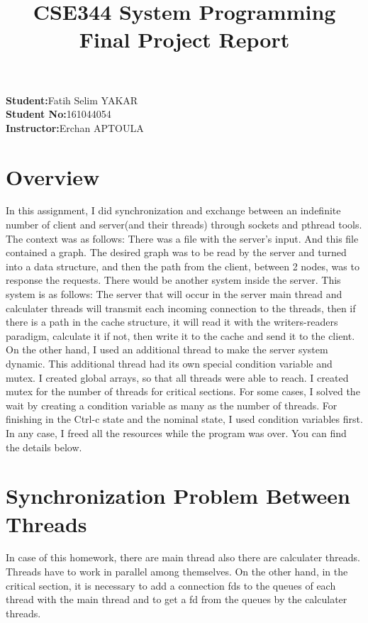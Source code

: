 \documentclass{article}
\title{\textbf{CSE344 System Programming Final Project Report}}
\begin{document}
\maketitle

\begin{center}
    \textbf{Student:}Fatih Selim YAKAR \\
    \textbf{Student No:}161044054 \\
    \textbf{Instructor:}Erchan APTOULA
\end{center}

\newpage

\section{Overview}
\par{In this assignment, I did synchronization and exchange between an indefinite number of client and server(and their threads) through sockets and pthread tools. The context was as follows: There was a file with the server's input. And this file contained a graph. The desired graph was to be read by the server and turned into a data structure, and then the path from the client, between 2 nodes, was to response the requests. There would be another system inside the server. This system is as follows: The server that will occur in the server main thread and calculater threads will transmit each incoming connection to the threads, then if there is a path in the cache structure, it will read it with the writers-readers paradigm, calculate it if not, then write it to the cache and send it to the client. On the other hand, I used an additional thread to make the server system dynamic. This additional thread had its own special condition variable and mutex. I created global arrays, so that all threads were able to reach. I created mutex for the number of threads for critical sections. For some cases, I solved the wait by creating a condition variable as many as the number of threads. For finishing in the Ctrl-c state and the nominal state, I used condition variables first. In any case, I freed all the resources while the program was over. You can find the details below.}

\section{Synchronization Problem Between Threads}
\par{In case of this homework, there are main thread also there are calculater threads. Threads have to work in parallel among themselves. On the other hand, in the critical section, it is necessary to add a connection fds to the queues of each thread with the main thread and to get a fd from the queues by the calculater threads.}
\end{document}
